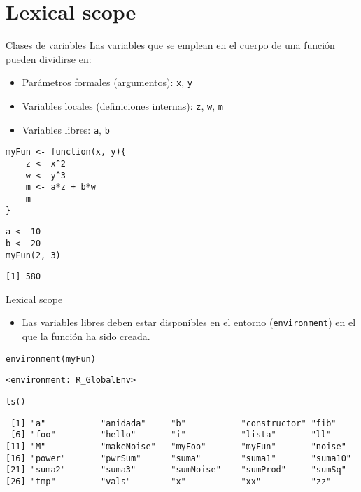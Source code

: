 \documentclass[xcolor={usenames,svgnames,dvipsnames}]{beamer}
\begin{document}
\section{Lexical scope}
\label{sec:org03bc96c}

\begin{frame}[label={sec:org4c614d0},fragile]{Clases de variables}
 Las variables que se emplean en el cuerpo de una función pueden
dividirse en:
\begin{itemize}
\item Parámetros formales (argumentos): \texttt{x}, \texttt{y}
\item Variables locales (definiciones internas): \texttt{z}, \texttt{w}, \texttt{m}
\item Variables libres: \texttt{a}, \texttt{b}
\end{itemize}
\lstset{language=r,label= ,caption= ,captionpos=b,numbers=none}
\begin{lstlisting}
myFun <- function(x, y){
    z <- x^2
    w <- y^3
    m <- a*z + b*w
    m
}
\end{lstlisting}

\lstset{language=r,label= ,caption= ,captionpos=b,numbers=none}
\begin{lstlisting}
a <- 10
b <- 20
myFun(2, 3)
\end{lstlisting}

\begin{verbatim}
[1] 580
\end{verbatim}
\end{frame}

\begin{frame}[label={sec:org28e3461},fragile]{Lexical scope}
 \begin{itemize}
\item Las variables libres deben estar disponibles en el entorno
(\texttt{environment}) en el que la función ha sido creada.
\end{itemize}
\lstset{language=r,label= ,caption= ,captionpos=b,numbers=none}
\begin{lstlisting}
environment(myFun) 
\end{lstlisting}

\begin{verbatim}
<environment: R_GlobalEnv>
\end{verbatim}


\lstset{language=r,label= ,caption= ,captionpos=b,numbers=none}
\begin{lstlisting}
ls()
\end{lstlisting}

\begin{verbatim}
 [1] "a"           "anidada"     "b"           "constructor" "fib"        
 [6] "foo"         "hello"       "i"           "lista"       "ll"         
[11] "M"           "makeNoise"   "myFoo"       "myFun"       "noise"      
[16] "power"       "pwrSum"      "suma"        "suma1"       "suma10"     
[21] "suma2"       "suma3"       "sumNoise"    "sumProd"     "sumSq"      
[26] "tmp"         "vals"        "x"           "xx"          "zz"
\end{verbatim}
\end{frame}
\end{document}
